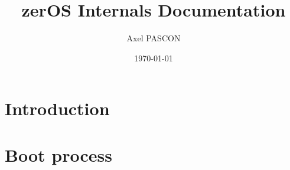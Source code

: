 \documentclass{report}
\title{zerOS Internals Documentation}
\author{Axel PASCON}
\date{\today}
\begin{document}
\maketitle

\tableofcontents

\chapter{Introduction}



\chapter{Boot process}


\end{document}
